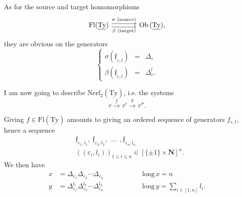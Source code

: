 \documentclass[11pt]{article}
\newcommand{\msp}[1]{\marginpar{\footnotesize [#1]}}
\newcommand{\uTy}{\underline{\mathrm{Ty}}}
\begin{document}
As for the source and target homomorphisms
\[
\begin{tikzcd}[column sep=large]
\mathrm{Fl}(\uTy) \arrow[r, shift left, "\sigma\text{ (source)}"] \arrow[r, shift right, "\beta\text{ (target)}"'] & \mathrm{Ob}\,(\uTy),
\end{tikzcd}
\]
they are obvious on the generators
\[
\left\{
\begin{array}{lcl}
\sigma(\mathfrak{f}_{\varepsilon,l}) & = & \Delta_\varepsilon\\[4pt]
\beta(\mathfrak{f}_{\varepsilon,l}) & = & \Delta^l_\varepsilon.
\end{array}
\right.
\]

I am now going to describe $\mathrm{Nerf}_2(\uTy)$, i.e. the systems
\[
\tau \xrightarrow{\ f\ } \tau' \xrightarrow{\ g\ } \tau''.
\]

\msp{page 52}
Giving $f\in\mathrm{Fl}(\uTy)$ amounts to giving an ordered sequence of generators $f_{\varepsilon,l}$, hence a sequence
\[
\begin{aligned}
&\mathfrak{f}_{\varepsilon_1,l_1},\ \mathfrak{f}_{\varepsilon_2,l_2},\ \ \dots\ \ ,\mathfrak{f}_{\varepsilon_n,l_n}\\
&((\varepsilon_i,l_i))_{1\leq i\leq n}\in[\{\pm1\}\times\mathbf{N}]^n.
\end{aligned}
\]
We then have
\[
\begin{aligned}
x &= \Delta_{\varepsilon_1}\Delta_{\varepsilon_2}\cdots\Delta_{\varepsilon_n} &\qquad\qquad& \mathrm{long}\,x = n\\
y &= \Delta^{l_1}_{\varepsilon_1}\Delta^{l_2}_{\varepsilon_2}\cdots\Delta^{l_n}_{\varepsilon_n} && \mathrm{long}\,y = \textstyle\sum_{i\in[1,n]} l_i.
\end{aligned}
\]
\end{document}
